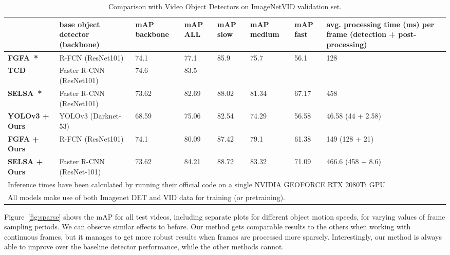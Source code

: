 \documentclass[letterpaper, 10 pt, conference]{ieeeconf}
\begin{document}
\begin{table*}[ht!]
\caption{Comparison with Video Object Detectors on ImageNetVID validation set.}
\centering
\begin{tabular}{|l||lp{1.2cm}||p{0.6cm}|p{0.6cm}|p{0.9cm}|p{0.6cm}|p{4.3cm}|}
\hline
  & \textbf{base object detector} (backbone) & \textbf{mAP backbone} & \textbf{mAP ALL} & \textbf{mAP slow} & \textbf{mAP medium} & \textbf{mAP fast} & \textbf{avg. processing time (ms) per frame (detection + post-processing)} \\ \hline
\textbf{FGFA~\cite{Zhu_2017_ICCV}*} & R-FCN (ResNet101)& 74.1 & 77.1 & 85.9 & 75.7 & 56.1 & 128  \\ \hline
\textbf{TCD~\cite{DBLP:journals/corr/abs-1811-11167}} & Faster R-CNN (ResNet101) & 74.6 & 83.5 &  &  &  & \\ \hline
\textbf{SELSA~\cite{wu2019selsa}*} & Faster R-CNN (ResNet101) & 73.62 & 82.69 & 88.02 & 81.34 & 67.17 & 458  \\ \hline
\hline
\textbf{YOLOv3 + Ours}  & YOLOv3 (Darknet-53) & 68.59 & 75.06 & 82.54 & 74.29 & 56.58 & 46.58 (44 + 2.58)  \\ \hline
\textbf{FGFA + Ours} & R-FCN (ResNet101) & 74.1 & 80.09 & 87.42 & 79.1 & 61.38 & 149 (128 + 21) \\ \hline
\textbf{SELSA + Ours}  & Faster R-CNN (ResNet-101) & 73.62 & 84.21 & 88.72 & 83.32 & 71.09 & 466.6 (458 + 8.6)  \\ \hline
\multicolumn{8}{p{15cm}}{\footnotesize{Inference times have been calculated by running their official code on a single NVIDIA GEOFORCE RTX 2080Ti GPU}}\\
\multicolumn{8}{p{15cm}}{\footnotesize{All models make use of both Imagenet DET and VID data for training (or pretraining).}}
\end{tabular}
\label{tab:video-comparison}
\end{table*}




Figure~\ref{fig:sparse} shows the mAP for all test videos, including separate plots for different object motion speeds, for varying values of frame sampling periods. We can observe similar effects to before. 
Our method gets comparable results to the others when working with continuous frames, but it manages to get more robust results when frames are processed more sparsely. Interestingly, our method is always able to improve over the baseline detector performance, while the other methods cannot. 
\end{document}
